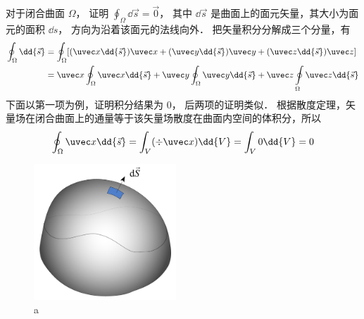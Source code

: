
对于闭合曲面 $\Omega$，  证明 $\oint_\Omega  \dd{\vec s} = \vec 0$， 其中 $\dd{\vec s}$ 是曲面上的面元矢量，其大小为面元的面积 $\dd{s}$，  方向为沿着该面元的法线向外．
把矢量积分分解成三个分量，有
\begin{equation}
\begin{aligned}
\oint_\Omega  \dd{\vec s} & = \oint_\Omega  [(\uvec x \dd{\vec s})\uvec x + (\uvec y \dd{\vec s})\uvec y + (\uvec z \dd{\vec s})\uvec z] \\
&= \uvec x\oint_\Omega  \uvec x \dd{\vec s}  + \uvec y\oint_\Omega \uvec y \dd{\vec s} + \uvec z\oint\limits_\Omega \uvec z \dd{\vec s}
\end{aligned}
\end{equation}
下面以第一项为例，证明积分结果为 0， 后两项的证明类似．
根据散度定理，矢量场在闭合曲面上的通量等于该矢量场散度在曲面内空间的体积分，所以
\begin{equation}
\oint_\Omega  \uvec x \dd{\vec s}  = \int_V (\div \uvec x) \dd{V}  = \int_V 0 \dd{V}  = 0
\end{equation}
\begin{figure}[ht]
\centering
\includegraphics[width=5.34cm]{./figures/CSI01.pdf}
\caption{a} \label{CSI0_fig1}
\end{figure}

 
 

